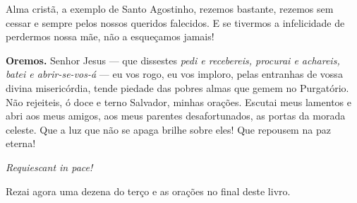 Alma cristã, a exemplo de Santo Agostinho, rezemos bastante, rezemos sem cessar e sempre pelos nossos queridos falecidos. E se tivermos a infelicidade de perdermos nossa mãe, não a esqueçamos jamais!


\vspace{\baselineskip}\noindent \textbf{Oremos.} Senhor Jesus --- que dissestes \textit{pedi e recebereis, procurai e achareis, batei e abrir-se-vos-á} --- eu vos rogo, eu vos imploro, pelas entranhas de vossa divina misericórdia, tende piedade das pobres almas que gemem no Purgatório. Não rejeiteis, ó doce e terno Salvador, minhas orações. Escutai meus lamentos e abri aos meus amigos, aos meus parentes desafortunados, as portas da morada celeste. Que a luz que não se apaga brilhe sobre eles! Que repousem na paz eterna!



\begin{center}
\textit{Requiescant in pace!}
\end{center}

Rezai agora uma dezena do terço e as orações no final deste livro.
